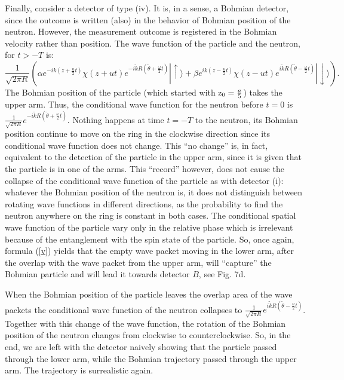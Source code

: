 \documentclass[12pt,preprint,tightenlines]{elsarticle}
\begin{document}
Finally, consider a detector of type (iv). It is, in a sense, a Bohmian
detector, since the outcome is written (also) in the behavior of Bohmian
position of the neutron. However, the measurement outcome is registered
in the Bohmian velocity rather than position. The wave function of
the particle and the neutron, for $t>-T$ is:
\begin{equation}
\frac{1}{\sqrt{2\pi R}}\left(\alpha e^{-ik(z+\frac{u}{2}t)}\chi(z+ut)e^{-i\tilde{k}R(\tilde{\theta}+\frac{\omega}{2}t)}|\uparrow\rangle+\beta e^{ik(z-\frac{u}{2}t)}\chi(z-ut)e^{i\tilde{k}R(\tilde{\theta}-\frac{\omega}{2}t)}|\downarrow\rangle\right).\label{psioutnox4}
\end{equation}
 The Bohmian position of the particle (which started with ${\rm z_{0}}=\frac{a}{5}$)
takes the upper arm. Thus, the conditional wave function for the neutron
before $t=0$ is $\frac{1}{\sqrt{2\pi R}}e^{-i\tilde{k}R(\tilde{\theta}+\frac{\omega}{2}t)}$.
Nothing happens at time $t=-T$ to the neutron, its Bohmian position
continue to move on the ring in the clockwise direction since its
conditional wave function does not change. This ``no change''
is, in fact, equivalent to the  detection of the particle in the upper arm, since it is
given that the particle is  in one of the arms. This ``record''
however, does not cause the collapse of the conditional wave function
of the particle as with detector (i): whatever the Bohmian position
of the neutron is, it does not distinguish between rotating wave functions
in different directions, as the probability to find the neutron anywhere
on the ring is constant in both cases. The conditional spatial wave function
of the particle  vary only
in the relative phase which is irrelevant because of the entanglement
with the spin state of the particle. So, once again, formula (\ref{v})
yields that the empty wave packet moving in the lower arm, after the overlap with the wave packet from the upper arm,
will ``capture'' the Bohmian particle and will lead it towards detector $B$, see Fig. 7d.


When the Bohmian position of the particle leaves the overlap area of the wave packets    the conditional wave function of the neutron collapses to
 $\frac{1}{\sqrt{2\pi R}}e^{i\tilde{k}R(\tilde{\theta}-\frac{\omega}{2}t)}$.
Together with this change of the wave function, the rotation of the Bohmian position of the neutron changes from
clockwise to counterclockwise. So, in the end,
we are left with the detector naively showing that the particle passed through the lower arm,
while the Bohmian trajectory passed through the upper arm. The trajectory is surrealistic
again.
\end{document}
